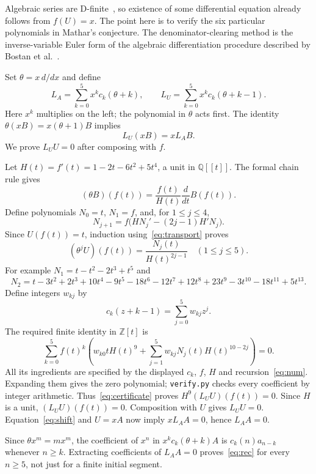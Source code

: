 \documentclass[10pt]{article}
\newcommand{\Q}{\mathbb{Q}}
\newcommand{\Z}{\mathbb{Z}}
\begin{document}
Algebraic series are D-finite~\cite[Theorem 2.1]{stanley}, so existence
of some differential equation already follows from $f(U)=x$. The point
here is to verify the six particular polynomials in Mathar's conjecture.
The denominator-clearing method is the inverse-variable Euler form of
the algebraic differentiation procedure described by
Bostan et al.~\cite[Section 2.1]{bostan}.

Set $\theta=x\,d/dx$ and define
\[
 L_A=\sum_{k=0}^{5}x^kc_k(\theta+k),\qquad
 L_U=\sum_{k=0}^{5}x^kc_k(\theta+k-1).
\]
Here $x^k$ multiplies on the left; the polynomial in $\theta$ acts first.
The identity $\theta(xB)=x(\theta+1)B$ implies
\begin{equation}\label{eq:shift}
 L_U(xB)=xL_AB.
\end{equation}
We prove $L_UU=0$ after composing with $f$.

Let $H(t)=f'(t)=1-2t-6t^2+5t^4$, a unit in $\Q[[t]]$. The formal
chain rule gives
\begin{equation}\label{eq:transport}
 (\theta B)(f(t))=\frac{f(t)}{H(t)}\frac{d}{dt}B(f(t)).
\end{equation}
Define polynomials $N_0=t$, $N_1=f$, and, for $1\leq j\leq4$,
\begin{equation}\label{eq:num}
 N_{j+1}=f\bigl(HN_j'-(2j-1)H'N_j\bigr).
\end{equation}
Since $U(f(t))=t$, induction using~\eqref{eq:transport} proves
\[
 (\theta^jU)(f(t))=\frac{N_j(t)}{H(t)^{2j-1}}
 \quad(1\leq j\leq5).
\]
For example $N_1=t-t^2-2t^3+t^5$ and
\[
 N_2=t-3t^2+2t^3+10t^4-9t^5-18t^6-12t^7
       +12t^8+23t^9-3t^{10}-18t^{11}+5t^{13}.
\]
Define integers $w_{kj}$ by
\begin{equation}\label{eq:weights}
 c_k(z+k-1)=\sum_{j=0}^{5}w_{kj}z^j.
\end{equation}
The required finite identity in $\Z[t]$ is
\begin{equation}\label{eq:certificate}
 \sum_{k=0}^{5}f(t)^k
 \left(w_{k0}tH(t)^9+
       \sum_{j=1}^{5}w_{kj}N_j(t)H(t)^{10-2j}\right)=0.
\end{equation}
All its ingredients are specified by the displayed $c_k$, $f$, $H$ and
recursion~\eqref{eq:num}. Expanding them gives the zero polynomial;
\texttt{verify.py} checks every coefficient by integer arithmetic.
Thus~\eqref{eq:certificate} proves
$H^9(L_UU)(f(t))=0$. Since $H$ is a unit, $(L_UU)(f(t))=0$.
Composition with $U$ gives $L_UU=0$. Equation~\eqref{eq:shift} and
$U=xA$ now imply $xL_AA=0$, hence $L_AA=0$.

Since $\theta x^m=mx^m$, the coefficient of $x^n$ in
$x^kc_k(\theta+k)A$ is $c_k(n)a_{n-k}$ whenever $n\geq k$.
Extracting coefficients of $L_AA=0$ proves~\eqref{eq:rec}
for every $n\geq5$, not just for a finite initial segment.
\end{document}
